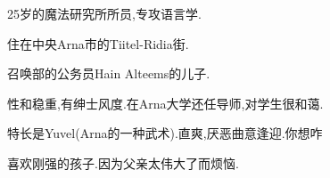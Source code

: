 \hfill
\begin{minipage}[b]{0.6\linewidth}
25岁的魔法研究所所员,专攻语言学.

住在中央Arna市的Tiitel-Ridia街.

召唤部的公务员Hain Alteems的儿子.

性和稳重,有绅士风度.在Arna大学还任导师,对学生很和蔼.

特长是Yuvel(Arna的一种武术).直爽,厌恶曲意逢迎.{\textcolor[rgb]{1,0.975,0.975}{你想咋}}

喜欢刚强的孩子.因为父亲太伟大了而烦恼.
\end{minipage}



    
    
    
    
    
    
    
    
    
    
 


